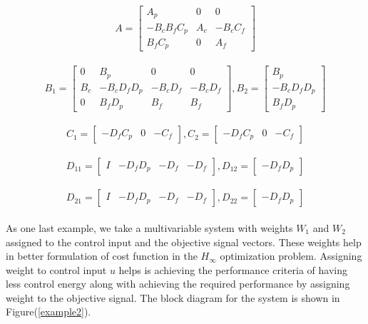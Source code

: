 \documentclass[a4paper,12pt]{article}
\begin{document}
				\[
				A =
				\begin{bmatrix}
				A_{p} & 0 & 0\\ -B_{c}B_{f}C_{p} & A_{c} & -B_{c}C_{f} \\ B_{f}C_{p} & 0 & A_{f}
				\end{bmatrix}
				\]	
				\\
				\[
				B_{1}=
				\begin{bmatrix}
				0 & B_{p} & 0 & 0 \\ B_{c} & -B_{c}D_{f}D_{p} & -B_{c}D_{f} & -B_{c}D_{f} \\
				0 & B_{f}D_{p} &  B_{f} & B_{f}
				\end{bmatrix}	
				,B_{2}=
				\begin{bmatrix}
				B_{p} \\ -B_{c}D_{f}D_{p} \\ B_{f}D_{p} 
				\end{bmatrix}	
				\]
				\\
				\[
				C_{1}=
				\begin{bmatrix}
				-D_{f}C_{p} & 0 & -C_{f}
				\end{bmatrix}	
				,C_{2}=
				\begin{bmatrix}
				-D_{f}C_{p} & 0 & -C_{f}
				\end{bmatrix}	
				\]	
				\\
				\[
				D_{11}=
				\begin{bmatrix}
				I & -D_{f}D_{p} & -D_{f} & -D_{f}
				\end{bmatrix}					
				,D_{12}=
				\begin{bmatrix}
				-D_{f}D_{p}
				\end{bmatrix}
				\]	
				\\
				\[	
				D_{21}=
				\begin{bmatrix}
				I & -D_{f}D_{p} & -D_{f} & -D_{f}
				\end{bmatrix}	
				,D_{22}=
				\begin{bmatrix}
				-D_{f}D_{p}
				\end{bmatrix}	
				\]
				\\
				As one last example, we take a multivariable system with weights $W_{1}$ and $W_{2}$ assigned to the control input and the objective signal vectors. These weights help in better formulation of cost function in the $H_{\infty}$ optimization problem. Assigning weight to control input $u$ helps is achieving the performance criteria of having less control energy along with achieving the required performance by assigning weight to the objective signal. The block diagram for the system is shown in Figure(\ref{example2}).
				
\end{document}
